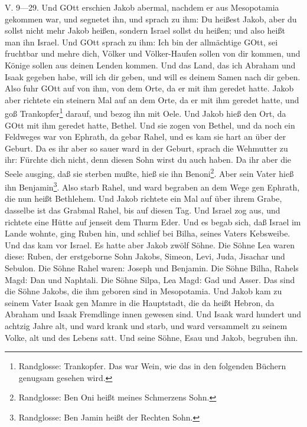 \begin{schriftzitat}
V. 9—29. Und GOtt erschien Jakob abermal, nachdem er aus Mesopotamia gekommen war, und segnetet ihn, und sprach zu ihm: Du heißest Jakob, aber du sollst nicht mehr Jakob heißen, sondern Israel sollst du heißen; und also heißt man ihn Israel. Und GOtt sprach zu ihm: Ich bin der allmächtige GOtt, sei fruchtbar und mehre dich, Völker und Völker-Haufen sollen von dir kommen, und Könige sollen aus deinen Lenden kommen. Und das Land, das ich Abraham und Isaak gegeben habe, will ich dir geben, und will es deinem Samen nach dir geben. Also fuhr GOtt auf von ihm, von dem Orte, da er mit ihm geredet hatte. Jakob aber richtete ein steinern Mal auf an dem Orte, da er mit ihm geredet hatte, und goß Trankopfer\footnote{Randglosse: Trankopfer. Das war Wein, wie das in den folgenden Büchern genugsam gesehen wird.} darauf, und bezog ihn mit Oele. Und Jakob hieß den Ort, da GOtt mit ihm geredet hatte, Bethel. Und sie zogen von Bethel, und da noch ein Feldweges war von Ephrath, da gebar Rahel, und es kam sie hart an über der Geburt. Da es ihr aber so sauer ward in der Geburt, sprach die Wehmutter zu ihr: Fürchte dich nicht, denn diesen Sohn wirst du auch haben. Da ihr aber die Seele ausging, daß sie sterben mußte, hieß sie ihn Benoni\footnote{Randglosse: Ben Oni heißt meines Schmerzens Sohn.}. Aber sein Vater hieß ihn Benjamin\footnote{Randglosse: Ben Jamin heißt der Rechten Sohn.}. Also starb Rahel, und ward begraben an dem Wege gen Ephrath, die nun heißt Bethlehem. Und Jakob richtete ein Mal auf über ihrem Grabe, dasselbe ist das Grabmal Rahel, bis auf diesen Tag. Und Israel zog aus, und richtete eine Hütte auf jenseit dem Thurm Eder. Und es begab sich, daß Israel im Lande wohnte, ging Ruben hin, und schlief bei Bilha, seines Vaters Kebsweibe. Und das kam vor Israel. Es hatte aber Jakob zwölf Söhne. Die Söhne Lea waren diese: Ruben, der erstgeborne Sohn Jakobs, Simeon, Levi, Juda, Jisachar und Sebulon. Die Söhne Rahel waren: Joseph und Benjamin. Die Söhne Bilha, Rahels Magd: Dan und Naphtali. Die Söhne Silpa, Lea Magd: Gad und Asser. Das sind die Söhne Jakobs, die ihm geboren sind in Mesopotamia. Und Jakob kam zu seinem Vater Isaak gen Mamre in die Hauptstadt, die da heißt Hebron, da Abraham und Isaak Fremdlinge innen gewesen sind. Und Isaak ward hundert und achtzig Jahre alt, und ward krank und starb, und ward versammelt zu seinem Volke, alt und des Lebens satt. Und seine Söhne, Esau und Jakob, begruben ihn.
\end{schriftzitat}




